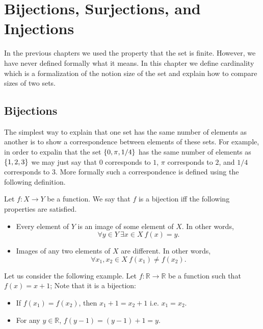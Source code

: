 \chapter{Bijections, Surjections, and Injections}
\label{chapter:bijections-surjections-injections}

In the previous chapters we used the property that the set is finite. However,
we have never defined formally what it means. In this chapter we define
cardinality which is a formalization of the notion size of the set and explain
how to compare sizes of two sets.

\section{Bijections}
The simplest way to explain that one set has the same number of elements as
another is to show a correspondence between elements of these sets. For example,
in order to expalin that the set $\set{0, \pi, 1 / 4}$ has the same number of
elements as $\set{1, 2, 3}$ we may just say that $0$ corresponds to $1$,
$\pi$ corresponds to $2$, and $1 / 4$ corresponds to $3$. More formally such a
correspondence is defined using the following definition.
\begin{definition}
  Let $f : X \to Y$ be a function. We say that $f$ is a bijection iff the
  following properties are satisfied.
  \begin{itemize}
    \item Every element of $Y$ is an image of some element of $X$. In other
    words,
      $$
          \forall y \in Y~\exists x \in X\ f(x) = y.
      $$
    \item Images of any two elements
      of $X$ are different. In other words,
      $$
          \forall x_1, x_2 \in X\ f(x_1) \neq f(x_2).
      $$
    \end{itemize}
\end{definition}

Let us consider the following example. Let $f : \mathbb{R} \to \mathbb{R}$ be a
function such that $f(x) = x + 1$; Note that it is a bijection:
\begin{itemize}
  \item If $f(x_1) = f(x_2)$, then $x_1 + 1 = x_2 + 1$ i.e. $x_1 = x_2$.
  \item For any $y \in \mathbb{R}$, $f(y - 1) = (y - 1) + 1 = y$.
\end{itemize}


